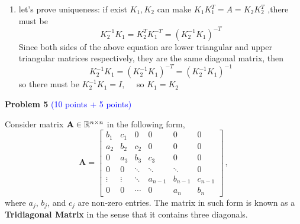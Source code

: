 \documentclass[english,onecolumn]{IEEEtran}
\begin{document}
\begin{enumerate}
 
    \item let's prove uniqueness:  if exist $K_{1}, K_{2}$ can make $K_{1} K_{1}^{T}=A=K_{2} K_{2}^{T}$ ,there must be $$
K_{2}^{-1} K_{1}=K_{2}^{T} K_{1}^{-T}=\left(K_{2}^{-1} K_{1}\right)^{-T}
$$
Since both sides of the above equation are lower triangular and upper triangular matrices respectively, they are the same diagonal matrix, then
$$
K_{2}^{-1} K_{1}=\left(K_{2}^{-1} K_{1}\right)^{-T}=\left(K_{2}^{-1} K_{1}\right)^{-1}
$$
so there must be  $K_{2}^{-1} K_{1}=I, \quad$ so $K_{1}=K_{2}$ 
\end{enumerate}

\newpage
\noindent\textbf{Problem 5}
\textcolor{blue}{(10 points + 5 points)}

\noindent Consider matrix ${\bf A} \in \mathbb{R}^{n\times n}$ in the following form,
\[
\mathbf{A} = 
\begin{bmatrix}
	b_1 & c_1 &  0  &  0 & 0  & 0 \\
	a_2 & b_2 & c_2 &  0 & 0  & 0 \\
	0   & a_3 & b_3 & c_3 & 0 & 0 \\
	0   & 0 & \ddots & \ddots& \ddots&0\\
	\vdots & \vdots & \ddots& a_{n-1}& b_{n-1}& c_{n-1}\\
	0 & 0 & \cdots & 0 & a_{n} & b_n 
\end{bmatrix}\,,
\]
where $a_j$, $b_j$, and $c_j$ are non-zero entries.
The matrix in such form is known as a \textbf{Tridiagonal Matrix} in the sense that it contains three diagonals.
\end{document}
